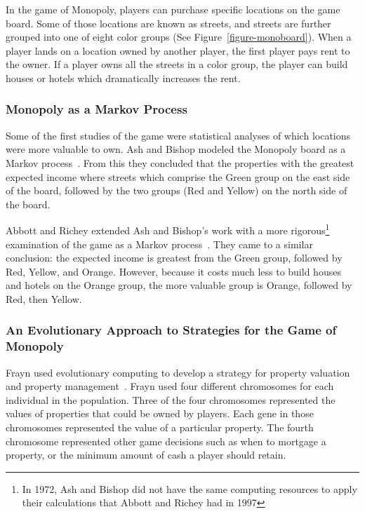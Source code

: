 In the game of Monopoly, players can purchase specific locations on the game
board. Some of those locations are known as streets, and streets are further
grouped into one of eight color groups (See Figure~\ref{figure-monoboard}). When
a player lands on a location owned by another player, the first player pays rent
to the owner. If a player owns all the streets in a color group, the player can
build houses or hotels which dramatically increases the rent.

\subsubsection{Monopoly as a Markov Process}

Some of the first studies of the game were statistical analyses of which
locations were more valuable to own. Ash and Bishop modeled the Monopoly board
as a Markov process~\cite{Ash1972}. From this they concluded that the properties
with the greatest expected income where streets which comprise the Green group
on the east side of the board, followed by the two groups (Red and Yellow) on
the north side of the board.

Abbott and Richey extended Ash and Bishop's work with a more
rigorous\footnote{In 1972, Ash and Bishop did not have the same computing
resources to apply their calculations that Abbott and Richey had in 1997}
examination of the game as a Markov process~\cite{Abbott1997}. They came to a
similar conclusion: the expected income is greatest from the Green group,
followed by Red, Yellow, and Orange. However, because it costs much less to
build houses and hotels on the Orange group, the more valuable group is Orange,
followed by Red, then Yellow.

\subsubsection{An Evolutionary Approach to Strategies for the Game of Monopoly}

Frayn used evolutionary computing to develop a strategy for property valuation
and property management~\cite{DBLP:conf/cig/Frayn05}. Frayn used four different
chromosomes for each individual in the population. Three of the four chromosomes
represented the values of properties that could be owned by players. Each gene
in those chromosomes represented the value of a particular property. The fourth
chromosome represented other game decisions such as when to mortgage a property,
or the minimum amount of cash a player should retain.

